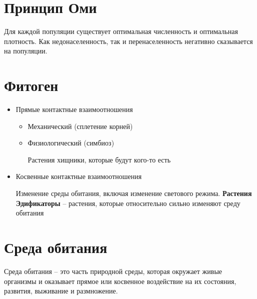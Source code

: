 \section{Принцип Оми}

Для каждой популяции существует оптимальная численность и
оптимальная плотность. Как недонаселенность, так и перенаселенность
негативно сказывается на популяции.

\section{Фитоген}

\begin{itemize}
    \item Прямые контактные взаимоотношения
        \begin{itemize}
            \item Механический
                (сплетение корней)
            \item Физиологический
                (симбиоз)

                Растения хищники, которые будут кого-то есть
        \end{itemize}

    \item Косвенные контактные взаимоотношения

        Изменение среды обитания, включая изменение светового режима.
        \textbf{Растения Эдификаторы} -- растения, которые относительно
        сильно изменяют среду обитания
\end{itemize}

\section{Среда обитания}

Среда обитания -- это часть природной среды, которая окружает живые
организмы и оказывает прямое или косвенное воздействие
на их состояния, развития, выживание и размножение.

